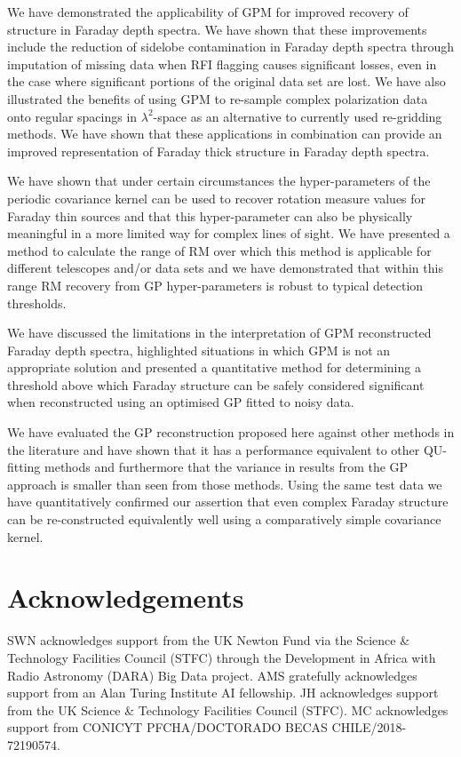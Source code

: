 \documentclass[fleqn,usenatbib]{mnras}
\begin{document}
We have demonstrated the applicability of GPM for improved recovery of structure in Faraday depth spectra. We have shown that these improvements include the reduction of sidelobe contamination in Faraday depth spectra through imputation of missing data when RFI flagging causes significant losses, even in the case where significant portions of the original data set are lost. We have also illustrated the benefits of using GPM to re-sample complex polarization data onto regular spacings in $\lambda^2$-space as an alternative to currently used re-gridding methods. We have shown that these applications in combination can provide an improved representation of Faraday thick structure in Faraday depth spectra.

We have shown that under certain circumstances the hyper-parameters of the periodic covariance kernel can be used to recover rotation measure values for Faraday thin sources and that this hyper-parameter can also be physically meaningful in a more limited way for complex lines of sight. We have presented a method to calculate the range of RM over which this method is applicable for different telescopes and/or data sets and we have demonstrated that within this range RM recovery from GP hyper-parameters is robust to typical detection thresholds.


We have discussed the limitations in the interpretation of GPM reconstructed Faraday depth spectra, highlighted situations in which GPM is not an appropriate solution and presented a quantitative method for determining a threshold above which Faraday structure can be safely considered significant when reconstructed using an optimised GP fitted to noisy data.

We have evaluated the GP reconstruction proposed here against other methods in the literature and have shown that it has a performance equivalent to other QU-fitting methods and furthermore that the variance in results from the GP approach is smaller than seen from those methods. Using the same test data we have quantitatively confirmed our assertion that even complex Faraday structure can be re-constructed equivalently well using a comparatively simple covariance kernel.


\section*{Acknowledgements}

SWN acknowledges support from the UK Newton Fund via the Science \& Technology Facilities Council (STFC) through the Development in Africa with Radio Astronomy (DARA) Big Data project. AMS gratefully acknowledges support from an Alan Turing Institute AI fellowship. JH acknowledges support from the UK Science \& Technology Facilities Council (STFC). MC acknowledges support from CONICYT PFCHA/DOCTORADO BECAS CHILE/2018-72190574.
\end{document}
